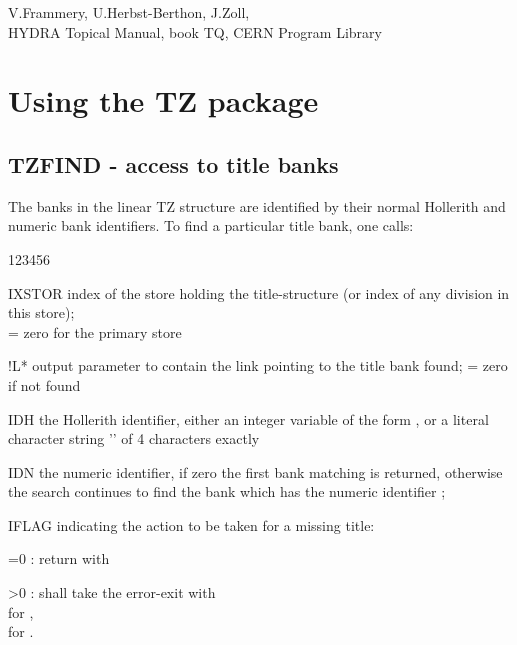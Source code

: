 V.Frammery, U.Herbst-Berthon, J.Zoll,\\
HYDRA Topical Manual, book TQ, CERN Program Library

\chapter{Using the TZ package}

\section{TZFIND - access to title banks}

The banks in the linear TZ structure are identified by their
normal Hollerith and numeric bank identifiers.
To find a particular title bank, one calls:


\begin{DLtt}{123456}
\item[IXSTOR]  index of the store holding the title-structure
               (or index of any division in this store);\\
               = zero for the primary store
\item[!L*]     output parameter to contain the link pointing
               to the title bank found; = zero if not found
\item[IDH]     the Hollerith identifier,  either
               an integer variable of the form , or
               a literal character string '' of 4 characters exactly
\item[IDN]     the numeric identifier,
               if zero the first bank matching  is returned,
               otherwise the search continues to find the bank 
               which has the numeric identifier ;
\item[IFLAG]   indicating the action to be taken for a missing title:
            \begin{DLtt}{12}
            \item[=0]:  return with 
            \item[>0]:   shall take the error-exit
                          with \\
                            for ,\\
                         for .
            \end{DLtt}
\end{DLtt}

